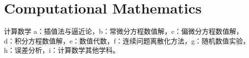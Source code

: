 


\chapter{Computational Mathematics}

计算数学
a：插值法与逼近论，b：常微分方程数值解，c：偏微分方程数值解，d：积分方程数值解，e：数值代数，f：连续问题离散化方法，g：随机数值实验，h：误差分析，i：计算数学其他学科。

